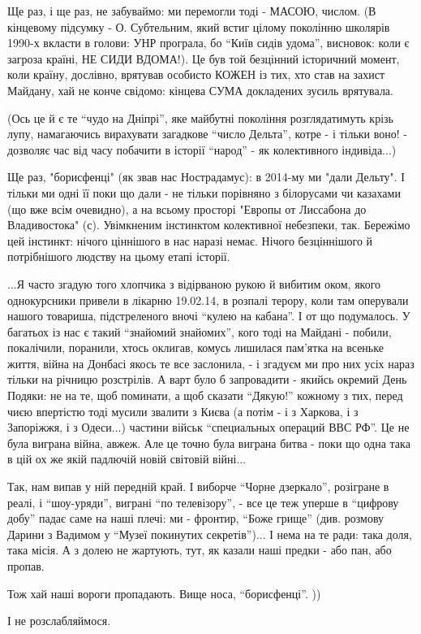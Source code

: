 Ще раз, і ще раз, не забуваймо: ми перемогли тоді - МАСОЮ, числом. (В кінцевому
підсумку - О. Субтельним, який встиг цілому поколінню школярів 1990-х вкласти в
голови: УНР програла, бо \enquote{Київ сидів удома}, висновок: коли є загроза країні,
НЕ СИДИ ВДОМА!). Це був той безцінний історичний момент, коли країну, дослівно,
врятував особисто КОЖЕН із тих, хто став на захист Майдану, хай не конче
свідомо: кінцева СУМА докладених зусиль врятувала. 

(Ось це й є те \enquote{чудо на Дніпрі}, яке майбутні покоління розглядатимуть крізь
лупу, намагаючись вирахувати загадкове \enquote{число Дельта}, котре - і тільки воно! -
дозволяє час від часу побачити в історії \enquote{народ} - як колективного індивіда...)

Ще раз, "борисфенці" (як звав нас Нострадамус): в 2014-му ми "дали Дельту". І
тільки ми одні її поки що дали - не тільки порівняно з білорусами чи казахами
(що вже всім очевидно), а на всьому просторі "Европы от Лиссабона до
Владивостока" (с). Увімкненим інстинктом колективної небезпеки, так. Бережімо
цей інстинкт: нічого ціннішого в нас наразі немає. Нічого безціннішого й
потрібнішого людству на цьому етапі історії.  

...Я часто згадую того хлопчика з відірваною рукою й вибитим оком, якого
однокурсники привели в лікарню 19.02.14, в розпалі терору, коли там оперували
нашого товариша, підстреленого вночі \enquote{кулею на кабана}. І от що подумалось. У
багатьох із нас є такий \enquote{знайомий знайомих}, кого тоді на Майдані - побили,
покалічили, поранили, хтось оклигав, комусь лишилася пам'ятка на всеньке життя,
війна на Донбасі якось те все заслонила, - і згадуєм ми про них усіх нараз
тільки на річницю розстрілів. А варт було б запровадити - якийсь окремий День
Подяки: не на те, щоб поминати, а щоб сказати \enquote{Дякую!} кожному з тих, перед
чиєю впертістю тоді мусили звалити з Києва (а потім - і з Харкова, і з
Запоріжжя, і з Одеси...) частини військ \enquote{специальных операций ВВС РФ}. Це не
була виграна війна, авжеж. Але це точно була виграна битва - поки що одна така
в цій ох же якій падлючій новій світовій війні...


Так, нам випав у ній передній край. І виборче \enquote{Чорне дзеркало}, розігране в
реалі, і \enquote{шоу-уряди}, виграні \enquote{по телевізору}, - все це теж уперше в \enquote{цифрову
добу} падає саме на наші плечі: ми - фронтир, \enquote{Боже грище} (див. розмову Дарини
з Вадимом у \enquote{Музеї покинутих секретів})... І нема на те ради: така доля, така
місія. А з долею не жартують, тут, як казали наші предки - або пан, або пропав. 

Тож хай наші вороги пропадають. Вище носа, \enquote{борисфенці}. ))

І не розслабляймося. 

